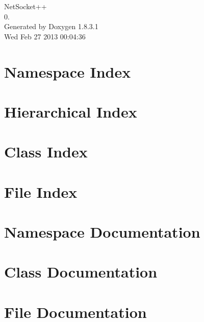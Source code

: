 \documentclass{book}
\begin{document}
\hypersetup{pageanchor=false,citecolor=blue}
\begin{titlepage}
\vspace*{7cm}
\begin{center}
{\Large Net\-Socket++ \\[1ex]\large 0. }\\
\vspace*{1cm}
{\large Generated by Doxygen 1.8.3.1}\\
\vspace*{0.5cm}
{\small Wed Feb 27 2013 00:04:36}\\
\end{center}
\end{titlepage}
\clearemptydoublepage
{}
\tableofcontents
\clearemptydoublepage
{}
\hypersetup{pageanchor=true,citecolor=blue}
\chapter{Namespace Index}

\chapter{Hierarchical Index}

\chapter{Class Index}

\chapter{File Index}

\chapter{Namespace Documentation}

\chapter{Class Documentation}








\chapter{File Documentation}







\printindex
\end{document}

